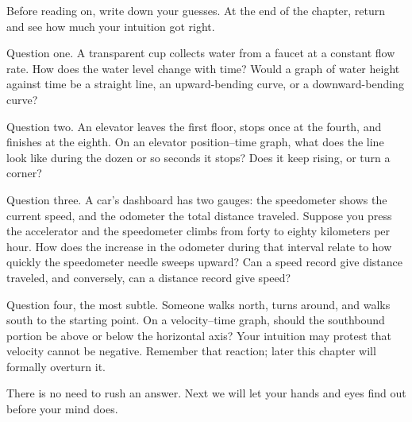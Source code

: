 Before reading on, write down your guesses. At the end of the chapter, return and see how much your intuition got right.

Question one. A transparent cup collects water from a faucet at a constant flow rate. How does the water level change with time? Would a graph of water height against time be a straight line, an upward-bending curve, or a downward-bending curve?

Question two. An elevator leaves the first floor, stops once at the fourth, and finishes at the eighth. On an elevator position--time graph, what does the line look like during the dozen or so seconds it stops? Does it keep rising, or turn a corner?

Question three. A car's dashboard has two gauges: the speedometer shows the current speed, and the odometer the total distance traveled. Suppose you press the accelerator and the speedometer climbs from forty to eighty kilometers per hour. How does the increase in the odometer during that interval relate to how quickly the speedometer needle sweeps upward? Can a speed record give distance traveled, and conversely, can a distance record give speed?

Question four, the most subtle. Someone walks north, turns around, and walks south to the starting point. On a velocity--time graph, should the southbound portion be above or below the horizontal axis? Your intuition may protest that velocity cannot be negative. Remember that reaction; later this chapter will formally overturn it.

There is no need to rush an answer. Next we will let your hands and eyes find out before your mind does.


